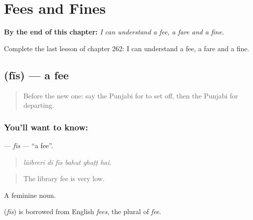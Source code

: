 
\chapter{Fees and Fines}
\label{ch:pa-a2-fees-and-fines}

\begin{chapteropening}
\textbf{By the end of this chapter:} \emph{I can understand a fee, a fare and a fine.}

Complete the last lesson of chapter 262: I can understand a fee, a fare and a fine.
\end{chapteropening}

\section[\texorpdfstring{\pa{ਫ਼ੀਸ} (fīs)}{ਫ਼ੀਸ (fīs)}]{ (fīs) — a fee}

\label{lesson:PA-C262-fis}



\begin{quote}
Before the new one: say the Punjabi for to set off, then the Punjabi for departing.
\end{quote}

\subsection*{You'll want to know: }
\textbf{} — \emph{fīs} — \textquotedblleft{}a fee\textquotedblright{}.

\begin{quote}
     
\end{quote}

\begin{quote}
\emph{lāibrerī dī fīs bahut ghaṭṭ hai.}
\end{quote}

\begin{quote}
The library fee is very low.
\end{quote}

A feminine noun.

\begin{cousinweb}
\textbf{} (\emph{fīs}) is borrowed from English \emph{fees}, the plural of \emph{fee}.
\end{cousinweb}


